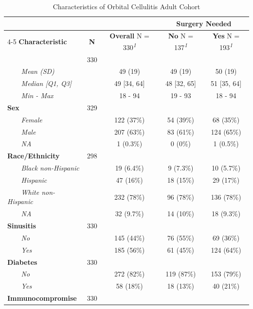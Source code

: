 \documentclass[
]{article}
\begin{document}
\begin{table}[t]
\caption*{
{\fontsize{20}{25}\selectfont  Characteristics of Orbital Cellulitis Adult Cohort\small }
} 
\begin{tabular*}{0.7\linewidth}{@{\extracolsep{\fill}}lcccc}
\toprule
 &  &  & \multicolumn{2}{c}{\textbf{Surgery Needed}} \\ 
\cmidrule(lr){4-5}
\textbf{Characteristic} & \textbf{N} & \textbf{Overall}  N = 330\textsuperscript{\textit{1}} & \textbf{No}  N = 137\textsuperscript{\textit{1}} & \textbf{Yes}  N = 193\textsuperscript{\textit{1}} \\ 
\midrule\addlinespace[2.5pt]
{\bfseries Age} & 330 &  &  &  \\ 
{\itshape     Mean (SD)} &  & 49 (19) & 49 (19) & 50 (19) \\ 
{\itshape     Median {[}Q1, Q3{]}} &  & 49 {[}34, 64{]} & 48 {[}32, 65{]} & 51 {[}35, 64{]} \\ 
{\itshape     Min - Max} &  & 18 - 94 & 19 - 93 & 18 - 94 \\ 
{\bfseries Sex} & 329 &  &  &  \\ 
{\itshape     Female} &  & 122 (37\%) & 54 (39\%) & 68 (35\%) \\ 
{\itshape     Male} &  & 207 (63\%) & 83 (61\%) & 124 (65\%) \\ 
{\itshape     NA} &  & 1 (0.3\%) & 0 (0\%) & 1 (0.5\%) \\ 
{\bfseries Race/Ethnicity} & 298 &  &  &  \\ 
{\itshape     Black non-Hispanic} &  & 19 (6.4\%) & 9 (7.3\%) & 10 (5.7\%) \\ 
{\itshape     Hispanic} &  & 47 (16\%) & 18 (15\%) & 29 (17\%) \\ 
{\itshape     White non-Hispanic} &  & 232 (78\%) & 96 (78\%) & 136 (78\%) \\ 
{\itshape     NA} &  & 32 (9.7\%) & 14 (10\%) & 18 (9.3\%) \\ 
{\bfseries Sinusitis} & 330 &  &  &  \\ 
{\itshape     No} &  & 145 (44\%) & 76 (55\%) & 69 (36\%) \\ 
{\itshape     Yes} &  & 185 (56\%) & 61 (45\%) & 124 (64\%) \\ 
{\bfseries Diabetes} & 330 &  &  &  \\ 
{\itshape     No} &  & 272 (82\%) & 119 (87\%) & 153 (79\%) \\ 
{\itshape     Yes} &  & 58 (18\%) & 18 (13\%) & 40 (21\%) \\ 
{\bfseries Immunocompromise} & 330 &  &  &  \\ 

\end{tabular*}
\end{table}
\end{document}
